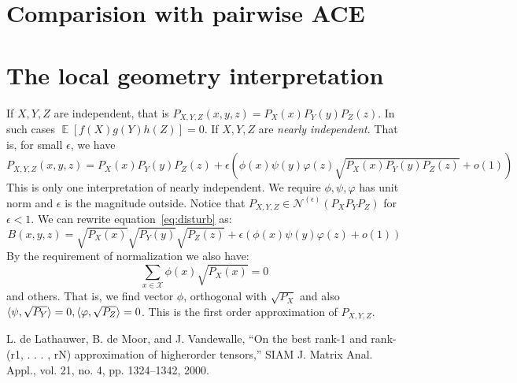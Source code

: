 \documentclass{article}
\DeclareMathOperator\E{\mathbb{E}}
\DeclarePairedDelimiter\inner{\langle}{\rangle}
\begin{document}
\section{Comparision with pairwise ACE}
\section{The local geometry interpretation}
If $X, Y, Z$ are independent, that is $P_{X, Y, Z}(x,y,z) = P_X(x) P_Y(y) P_Z(z)$. In such cases $\E[f(X) g(Y) h(Z)] = 0$.
If $X, Y, Z$ are \textit{nearly independent}. That is, for small $\epsilon$, we have 
\begin{equation}\label{eq:disturb}
P_{X, Y, Z}(x,y,z) = P_X(x) P_Y(y) P_Z(z) + \epsilon (\phi(x)\psi(y)\varphi(z)\sqrt{P_X(x)P_Y(y)P_Z(z)} + o(1))
\end{equation}
This is only one interpretation of nearly independent. 
We require $\phi, \psi, \varphi $ has unit norm and $\epsilon$ is the magnitude outside.
Notice that $P_{X, Y, Z} \in \mathcal{N}^{(\epsilon)}(P_X P_Y P_Z)$ for $\epsilon<1$.
We can rewrite equation~\eqref{eq:disturb} as:
\begin{equation}
B(x, y, z) = \sqrt{P_X(x)}\sqrt{P_Y(y)} \sqrt{P_Z(z)} + \epsilon(\phi(x) \psi(y)  \varphi(z) + o(1) )
\end{equation}
By the requirement of normalization we also have:
$$\sum_{x\in \mathcal{X}} \phi(x)\sqrt{P_X(x)}=0$$ and others.
That is, we find vector $\phi$, orthogonal with $\sqrt{P_X}$ and also $\inner{\psi, \sqrt{P_Y}}=0, \inner{\varphi, \sqrt{P_Z}}=0$. This is the first order approximation of $P_{X, Y, Z}$.



\begin{thebibliography}{9}
 L. de Lathauwer, B. de Moor, and J. Vandewalle, “On the
best rank-1 and rank-(r1, . . . , rN) approximation of higherorder
tensors,” SIAM J. Matrix Anal. Appl., vol. 21, no. 4,
pp. 1324–1342, 2000. 
\end{thebibliography}
\end{document}
